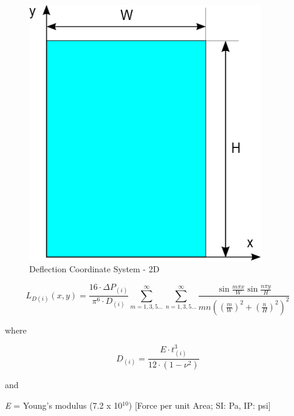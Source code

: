 \begin{figure}[hbtp] %
\centering
\includegraphics[width=0.9\textwidth, height=0.9\textheight, keepaspectratio=true]{media/image1779.png}
\caption{Deflection Coordinate System - 2D \protect \label{fig:deflection-coordinate-system-2d}}
\end{figure}

\begin{equation}
{L_{D\left( i \right)}}\left( {x,y} \right) = \frac{{16\cdot \Delta {P_{\left( i \right)}}}}{{{\pi ^6}\cdot {D_{\left( i \right)}}}}\mathop \sum \limits_{m = 1,3,5 \ldots }^\infty  \mathop \sum \limits_{n = 1,3,5 \ldots }^\infty  \frac{{\sin \frac{{m\pi x}}{W}\sin \frac{{n\pi y}}{H}}}{{mn{{\left( {{{\left( {\frac{m}{W}} \right)}^2} + {{\left( {\frac{n}{H}} \right)}^2}} \right)}^2}}}
\label{eq:IGUDeflection}
\end{equation}

where

\begin{equation}
{D_{\left( i \right)}} = \frac{{E\cdot t_{\left( i \right)}^3}}{{12\cdot \left( {1 - {\nu ^2}} \right)}}
\label{eq:IGUDiDeflection}
\end{equation}

and

\emph{E} = Young's modulus (7.2 x 10\(^{10}\)) {[}Force per unit Area; SI: Pa, IP: psi{]}

